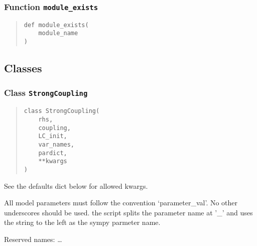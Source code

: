\documentclass[english,a4paper,oneside]{article}
\begin{document}
\subsubsection{\texorpdfstring{Function
\texttt{module\_exists}}{Function module\_exists}}\label{StrongCoupling.module_exists}

\begin{quote}
\begin{verbatim}
def module_exists(
    module_name
)
\end{verbatim}
\end{quote}

\subsection{Classes}\label{classes}

\subsubsection{\texorpdfstring{Class
\texttt{StrongCoupling}}{Class StrongCoupling}}\label{StrongCoupling.StrongCoupling}

\begin{quote}
\begin{verbatim}
class StrongCoupling(
    rhs,
    coupling,
    LC_init,
    var_names,
    pardict,
    **kwargs
)
\end{verbatim}
\end{quote}

See the defaults dict below for allowed kwargs.

All model parameters must follow the convention `parameter\_val'. No
other underscores should be used. the script splits the parameter name
at '\_' and uses the string to the left as the sympy parmeter name.

Reserved names: \ldots{}
\end{document}
